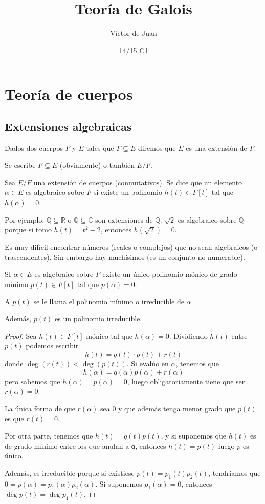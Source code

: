 \documentclass{apuntes}
\title{Teoría de Galois}
\author{Víctor de Juan}
\date{14/15 C1}
\begin{document}
\pagestyle{plain}
\maketitle

\tableofcontents
\newpage

\chapter{Teoría de cuerpos}

\section{Extensiones algebraicas}

\begin{defn}
Dados dos cuerpos $F$ y $E$ tales que $F⊆E$ diremos que $E$ es una extensión de $F$.

Se escribe $F⊆E$ (obviamente) o también $E/F$.
\end{defn}

\begin{defn}
Sea $E/F$ una extensión de cuerpos (conmutativos). Se dice que un elemento $α∈E$ es algebraico sobre $F$ si existe un polinomio $h(t) ∈ F[t]$ tal que $h(α) = 0$.
\end{defn}

Por ejemplo, $ℚ⊆ℝ$ o $ℚ⊆ℂ$ son extensiones de $ℚ$. $\sqrt{2}$ es algebraico sobre $ℚ$ porque si tomo $h(t) = t^2 - 2$, entonces $h(\sqrt{2}) = 0$.

Es muy difícil encontrar números (reales o complejos) que no sean algebraicos (o trascendentes). Sin embargo hay muchísimos (es un conjunto no numerable).

\begin{prop} SI $α∈E$ es algebraico sobre $F$ existe un único polinomio mónico de grado mínimo $p(t) ∈ F[t]$ tal que $p(α) = 0$.

A $p(t)$ se le llama el polinomio mínimo o irreducible de $α$.

Además, $p(t)$ es un polinomio irreducible.
\end{prop}

\begin{proof}
Sea $h(t) ∈ F[t]$ mónico tal que $h(α) = 0$. Dividiendo $h(t)$ entre $p(t)$ podemos escribir \[ h(t) = q(t) · p(t) + r(t) \] donde $\deg(r(t)) < \deg(p(t))$. Si evalúo en $α$, tenemos que \[ h(α) = q(α)p(α) + r(α) \] pero sabemos que $h(α) = p(α) = 0$, luego obligatoriamente tiene que ser $r(α) = 0$.

La única forma de que $r(α)$ sea 0 y que además tenga menor grado que $p(t)$ es que $r(t) = 0$.

Por otra parte, tenemos que $h(t) = q(t)p(t)$, y si suponemos que $h(t)$ es de grado mínimo entre los que anulan a α, entonces $h(t) = p(t)$ luego $p$ es único.

Además, es irreducible porque si existiese $p(t) = p_1(t) p_2(t)$, tendríamos que $0 = p(α) = p_1(α) p_2(α)$. Si suponemos $p_1(α) = 0$, entonces $\deg p(t) = \deg p_1(t)$.
\end{proof}
\end{document}
